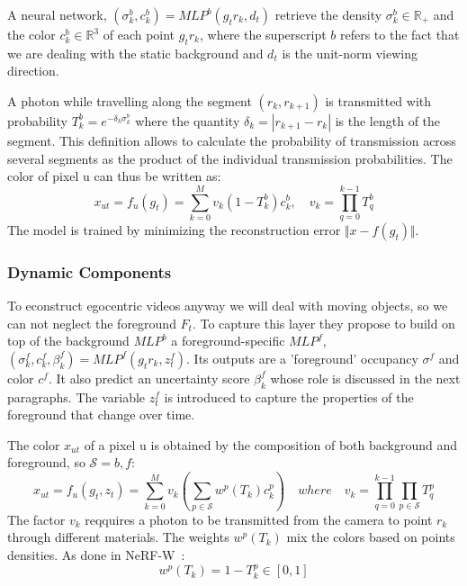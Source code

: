 A neural network, $(\sigma_k^b,c_k^b) = MLP^b(g_t r_k,d_t)$ retrieve the density 
$\sigma_k^b \in\mathbb{R}_{+}$ and the color $c_k^b \in \mathbb{R}^{3}$ of each point $g_t r_k$,
where the superscript $b$ refers to the fact that we are dealing with the static background and
$d_t$ is the unit-norm viewing direction.

A photon while travelling along the segment $(r_k,r_{k+1})$ is transmitted with probability
$T_k^b = e^{-\delta_k \sigma_k^b}$ where the quantity $\delta_k = |r_{k+1} - r_k|$ is the length of 
the segment. This definition allows to calculate the probability of transmission across several segments
as the product of the individual transmission probabilities. The color of pixel u can thus be written as:
\begin{equation}
    x_{ut} = f_u(g_t) = \sum_{k=0}^{M} v_k (1-T_k^b)c_k^b, \quad v_k = \prod_{q=0}^{k-1} T_q^b
\end{equation}
The model is trained by minimizing the reconstruction error $\Vert x - f(g_t)\Vert $.

\subsubsection{Dynamic Components}
To econstruct egocentric videos anyway we will deal with moving objects, so we can
not neglect the foreground $F_t$. To capture this layer they propose to build on top 
of the background $MLP^b$ a foreground-specific 
$MLP^f$,$(\sigma_k^f,c_k^f,\beta_k^f) = MLP^f(g_t r_k, z_t^f)$. Its outputs are a 'foreground'
occupancy $\sigma^f$ and color $c^f$. It also predict an uncertainty score $\beta_k^f$
whose role is discussed in the next paragraphs. The variable $z_t^f$ is introduced 
to capture the properties of the foreground that change over time.

The color $x_{ut}$ of a pixel u is obtained by the composition of both background and
foreground, so $\mathcal{S} = {b,f}$:
\begin{equation}\label{eq:2}
    x_{ut} = f_{u}(g_t,z_t) = \sum_{k=0}^{M} v_k(\sum_{p \in \mathcal{S}} w^p(T_k)c_k^p)
    \quad where \quad v_k = \prod_{q=0}^{k-1}\prod_{p \in \mathcal{S}} T_q^p
\end{equation}
The factor $v_k$ reqquires a photon to be transmitted from the camera to point $r_k$
through different materials. The weights $w^p(T_k)$ mix the colors based on points densities.
As done in NeRF-W~\cite{nerfw}:
\begin{equation}\label{eq:weights}
    w^p(T_k) = 1 - T_k^p \in [0,1]
\end{equation}


